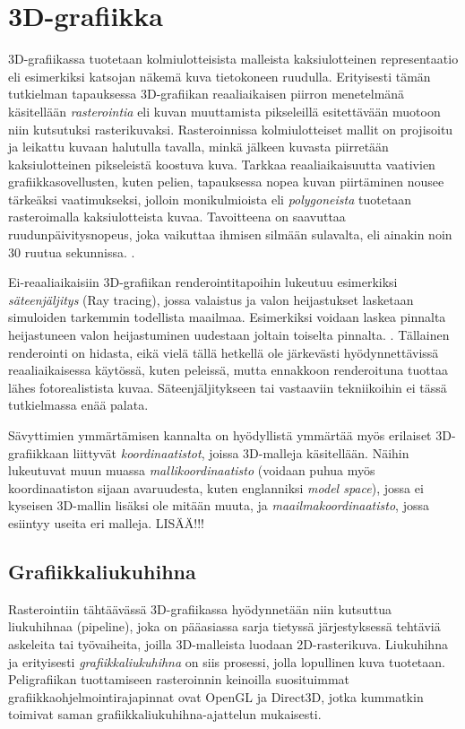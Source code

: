 \documentclass[finnish]{tktltiki2}
\theoremstyle{definition}
\theoremstyle{remark}
\begin{document}
\section{3D-grafiikka}

3D-grafiikassa tuotetaan kolmiulotteisista malleista kaksiulotteinen representaatio eli esimerkiksi katsojan näkemä kuva tietokoneen ruudulla. Erityisesti tämän tutkielman tapauksessa 3D-grafiikan reaaliaikaisen piirron menetelmänä käsitellään \emph{rasterointia} eli kuvan muuttamista pikseleillä esitettävään muotoon niin kutsutuksi rasterikuvaksi. Rasteroinnissa kolmiulotteiset mallit on projisoitu ja leikattu kuvaan halutulla tavalla, minkä jälkeen kuvasta piirretään kaksiulotteinen pikseleistä koostuva kuva. Tarkkaa reaaliaikaisuutta vaativien grafiikkasovellusten, kuten pelien, tapauksessa nopea kuvan piirtäminen nousee tärkeäksi vaatimukseksi, jolloin monikulmioista eli \emph{polygoneista} tuotetaan rasteroimalla kaksiulotteista kuvaa. Tavoitteena on saavuttaa ruudunpäivitysnopeus, joka vaikuttaa ihmisen silmään sulavalta, eli ainakin noin 30 ruutua sekunnissa. \cite[s. 444-445]{Gre14}. 

Ei-reaaliaikaisiin 3D-grafiikan renderointitapoihin lukeutuu esimerkiksi \emph{säteenjäljitys} (Ray tracing), jossa valaistus ja valon heijastukset lasketaan simuloiden tarkemmin todellista maailmaa. Esimerkiksi voidaan laskea pinnalta heijastuneen valon heijastuminen uudestaan joltain toiselta pinnalta. \cite[s.405-]{Puh08}. Tällainen renderointi on hidasta, eikä vielä tällä hetkellä ole järkevästi hyödynnettävissä reaaliaikaisessa käytössä, kuten peleissä, mutta ennakkoon renderoituna tuottaa lähes fotorealistista kuvaa. Säteenjäljitykseen tai vastaaviin tekniikoihin ei tässä tutkielmassa enää palata.

Sävyttimien ymmärtämisen kannalta on hyödyllistä ymmärtää myös erilaiset 3D-grafiikkaan liittyvät \emph{koordinaatistot}, joissa 3D-malleja käsitellään. Näihin lukeutuvat muun muassa \emph{mallikoordinaatisto} (voidaan puhua myös koordinaatiston sijaan avaruudesta, kuten englanniksi \emph{model space}), jossa ei kyseisen 3D-mallin lisäksi ole mitään muuta, ja \emph{maailmakoordinaatisto}, jossa esiintyy useita eri malleja.  LISÄÄ!!!

\subsection{Grafiikkaliukuhihna}
Rasterointiin tähtäävässä 3D-grafiikassa hyödynnetään niin kutsuttua liukuhihnaa (pipeline), joka on pääasiassa sarja tietyssä järjestyksessä tehtäviä askeleita tai työvaiheita, joilla 3D-malleista luodaan 2D-rasterikuva. Liukuhihna ja erityisesti \emph{grafiikkaliukuhihna} on siis prosessi, jolla lopullinen kuva tuotetaan. Peligrafiikan tuottamiseen rasteroinnin keinoilla suosituimmat grafiikkaohjelmointirajapinnat ovat OpenGL ja Direct3D, jotka kummatkin toimivat saman grafiikkaliukuhihna-ajattelun mukaisesti.
\end{document}

